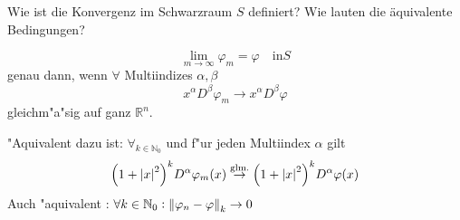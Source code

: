 \documentclass[9pt]{article}
\newcommand{\Rn}{\mathbb{R}^n}
\newenvironment{field}{}{\newpage}
\newif\ifnote
\newenvironment{note}{\notetrue}{\notefalse}
\newcommand{\localtag}{}
\newcommand{\globaltag}{}
\newcommand{\uuid}{}
\newcommand{\tags}[1]{
    \ifnote 
        \renewcommand{\localtag}{#1}
    \else
        \renewcommand{\globaltag}{#1}
    \fi 
    }
\newcommand{\xplain}[1]{\renewcommand{\uuid}{#1}}
\begin{document}
			\begin{note}
				\xplain{df8ad57b-bcf6-4826-8dc0-8c97a582cd0e}
				\tags{}
				
				\begin{field}  %
					Wie ist die Konvergenz im Schwarzraum $S$  definiert?
					Wie lauten die äquivalente Bedingungen?
				\end{field}
				
				\begin{field}  %
					\begin{equation*}
					\lim\limits_{m\rightarrow\infty} \varphi_m = \varphi \quad \text{in} S
					\end{equation*}
					genau dann, wenn $\forall$ Multiindizes $\alpha, \beta$
					\begin{equation*}
						x^\alpha D^\beta\varphi_m \rightarrow x^\alpha D^\beta\varphi
					\end{equation*}
					gleichm"a"sig auf ganz $\Rn$.
					
					"Aquivalent dazu ist: $\forall_{k\in \mathbb{N}_0}$ und f"ur jeden Multiindex $\alpha$ gilt
					\tiny\begin{equation*}
						\qty(1+\abs{x}^2)^kD^\alpha\varphi_m(x) \overset{\text{glm.}}{\rightarrow}
						\qty(1+\abs{x}^2)^kD^\alpha\varphi(x)
					\end{equation*}
					\normalsize
					Auch "aquivalent : $\forall k \in \mathbb{N}_0 : \norm{\varphi_n - \varphi}_k \rightarrow 0$ 
				\end{field}
				\end{note}
\end{document}
